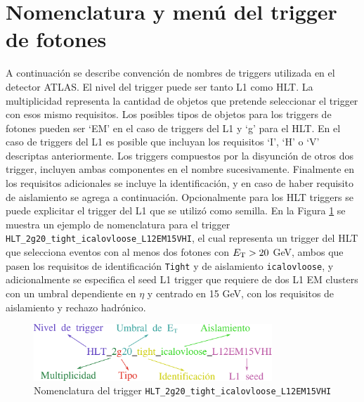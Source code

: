 \section{Nomenclatura y menú del trigger de fotones}




A continuación se describe convención de nombres de triggers utilizada en el detector ATLAS.
El nivel del trigger puede ser tanto L1 como HLT. La multiplicidad representa la cantidad de objetos que pretende seleccionar el trigger con esos mismo requisitos. Los posibles tipos de objetos para los triggers de fotones pueden ser `EM' en el caso de triggers del L1 y `g' para el HLT. En el caso de triggers del L1 es posible que incluyan los requisitos `I', `H' o `V' descriptas anteriormente. Los triggers compuestos por la disyunción de otros dos trigger, incluyen ambas componentes en el nombre sucesivamente. Finalmente en los requisitos adicionales se incluye la identificación, y en caso de haber requisito de aislamiento se agrega a continuación. Opcionalmente para los HLT triggers se puede explicitar el trigger del L1 que se utilizó como semilla. En la Figura \ref{fig:trigger_name} se muestra un ejemplo de nomenclatura para el trigger \texttt{HLT\_2g20\_tight\_icalovloose\_L12EM15VHI}, el cual representa un trigger del HLT que selecciona eventos con al menos dos fotones con $E_{\text{T}}>20$ GeV, ambos que pasen los requisitos de identificación \texttt{Tight} y de aislamiento \texttt{icalovloose}, y adicionalmente se especifica el seed L1 trigger que requiere de dos L1 EM clusters con un umbral dependiente en $\eta$ y centrado en 15 GeV, con los requisitos de aislamiento y rechazo hadrónico.

\begin{figure}
  \centering
  \includegraphics[width=0.8\textwidth]{images/trigger/trigger_name.pdf}
  \caption{Nomenclatura del trigger \texttt{HLT\_2g20\_tight\_icalovloose\_L12EM15VHI}}
  \label{fig:trigger_name}
\end{figure}

